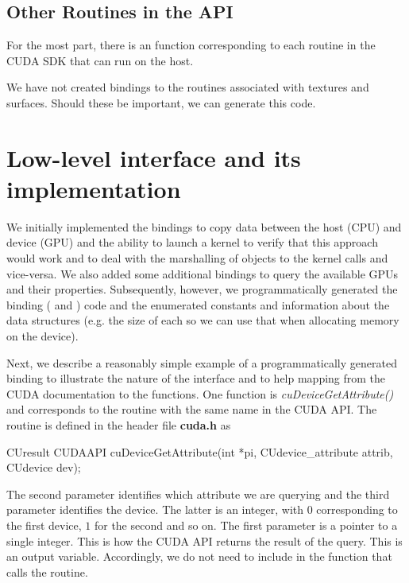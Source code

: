 \documentclass[article]{jss}
\def\C{\proglang{C}}
\def\R{\proglang{R}}
\def\Rfunc#1{\textsl{#1()}}
\def\file#1{\textbf{#1}}
\begin{document}
\subsection{Other Routines in the API}

For the most part, there is an \R{} function corresponding 
to  each routine in the CUDA SDK  that can run on the host.

We have not created bindings to the routines associated with textures
and surfaces.  Should these be important, we can generate this code.
 






\section{Low-level interface and its implementation}
We initially implemented the bindings to copy data between the host
(CPU) and device (GPU) and the ability to launch a kernel to verify
that this approach would work and to deal with the marshalling of \R{}
objects to the kernel calls and vice-versa.  We also added some
additional bindings to query the available GPUs and their properties.
Subsequently, however, we programmatically generated the binding (\R{}
and \C) code and the enumerated constants and information about the
data structures (e.g. the size of each so we can use that when
allocating memory on the device).  

Next, we describe a reasonably simple example of a programmatically
generated binding to illustrate the nature of the interface and to
help mapping  from the CUDA documentation to the \R{} functions.
One function is \Rfunc{cuDeviceGetAttribute} and corresponds to the routine
with the same name in the CUDA API.
The routine is defined  in the header file \file{cuda.h} as
\begin{Code}
CUresult CUDAAPI 
cuDeviceGetAttribute(int *pi, CUdevice_attribute attrib, CUdevice dev);
\end{Code}
The second parameter identifies which attribute we are querying and
the third parameter identifies the device. The latter is an integer,
with $0$ corresponding to the first device, $1$ for the second and so
on.  The first parameter is a pointer to a single integer. This is how
the CUDA API returns the result of the query.  This is an output
variable. Accordingly, we do not need to include in the \R{} function
that calls the \C{} routine.
\end{document}
